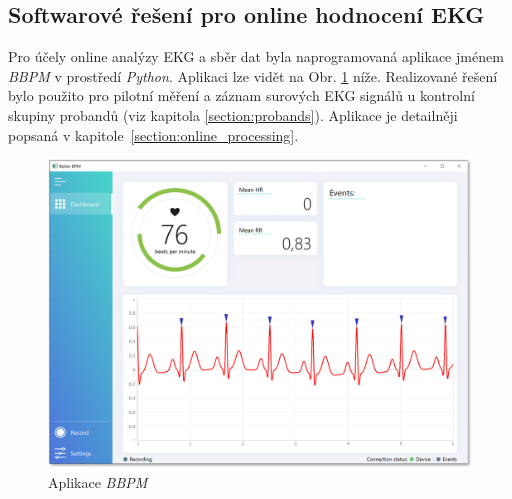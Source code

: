 



\subsection{Softwarové řešení pro online hodnocení EKG}
\label{sections:result_offline}
Pro účely online analýzy EKG a sběr dat byla naprogramovaná aplikace jménem
\textit{BBPM} v prostředí \textit{Python}. Aplikaci lze vidět na Obr.
\ref{fig:results_bbpm} níže. Realizované řešení bylo použito pro pilotní měření
a záznam surových EKG signálů u kontrolní skupiny probandů (viz kapitola
\ref{section:probands}). Aplikace je detailněji popsaná v
kapitole~\ref{section:online_processing}.

\begin{figure}[H]
	\begin{center}
		\includegraphics[width=1\textwidth]{../assets/bbpm/bbpm_app}
		\caption{Aplikace \textit{BBPM}}
		\label{fig:results_bbpm}
	\end{center}
\end{figure}

